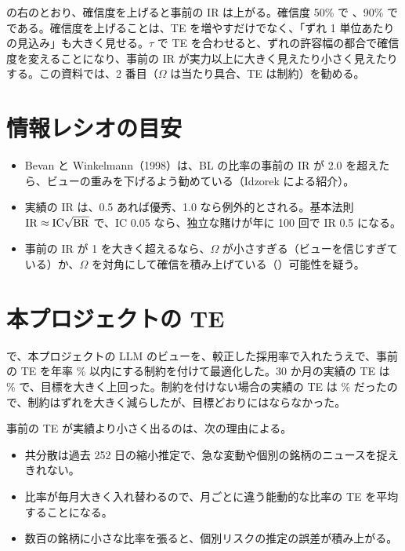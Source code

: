  の右のとおり、確信度を上げると事前の IR は上がる。確信度 50\% で 、90\% で  である。確信度を上げることは、TE を増やすだけでなく、「ずれ 1 単位あたりの見込み」も大きく見せる。$\tau$ で TE を合わせると、ずれの許容幅の都合で確信度を変えることになり、事前の IR が実力以上に大きく見えたり小さく見えたりする。この資料では、2 番目（$\Omega$ は当たり具合、TE は制約）を勧める。

\section{情報レシオの目安}

\begin{itemize}
\item Bevan と Winkelmann（1998）は、BL の比率の事前の IR が 2.0 を超えたら、ビューの重みを下げるよう勧めている（Idzorek による紹介）。
\item 実績の IR は、0.5 あれば優秀、1.0 なら例外的とされる。基本法則 $\mathrm{IR}\approx\mathrm{IC}\sqrt{\mathrm{BR}}$ で、IC 0.05 なら、独立な賭けが年に 100 回で IR 0.5 になる。
\item 事前の IR が 1 を大きく超えるなら、$\Omega$ が小さすぎる（ビューを信じすぎている）か、$\Omega$ を対角にして確信を積み上げている（）可能性を疑う。
\end{itemize}

\section{本プロジェクトの TE}\label{sec:te-project}

 で、本プロジェクトの LLM のビューを、較正した採用率で入れたうえで、事前の TE を年率 \% 以内にする制約を付けて最適化した。30 か月の実績の TE は \% で、目標を大きく上回った。制約を付けない場合の実績の TE は \% だったので、制約はずれを大きく減らしたが、目標どおりにはならなかった。

事前の TE が実績より小さく出るのは、次の理由による。

\begin{itemize}
\item 共分散は過去 252 日の縮小推定で、急な変動や個別の銘柄のニュースを捉えきれない。
\item 比率が毎月大きく入れ替わるので、月ごとに違う能動的な比率の TE を平均することになる。
\item 数百の銘柄に小さな比率を張ると、個別リスクの推定の誤差が積み上がる。
\end{itemize}

